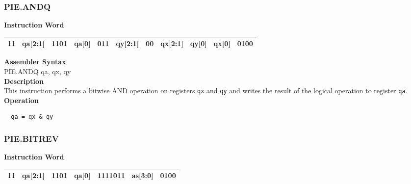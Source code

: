 \subsubsection{PIE.ANDQ}\label{instruction:PIEANDQ}
\setlength\tabcolsep{6pt}
\textbf{Instruction Word} \\
\begin{tabular}{|c|c|c|c|c|c|c|c|c|c|c|}
	\hline
	11 & qa[2:1] & 1101 & qa[0] & 011 & qy[2:1] & 00 & qx[2:1] & qy[0] & qx[0] & 0100 \\
	\hline
\end{tabular}

\textbf{Assembler Syntax} \\
PIE.ANDQ qa, qx, qy \\
\textbf{Description} \\
This instruction performs a bitwise AND operation on registers \lstinline{qx} and \lstinline{qy} and writes the result of the logical operation to register \lstinline{qa}.\\
\textbf{Operation}
\begin{lstlisting}
  qa = qx & qy
\end{lstlisting}

\newpage
\subsubsection{PIE.BITREV}\label{instruction:PIEBITREV}
\setlength\tabcolsep{6pt}
\textbf{Instruction Word} \\
\begin{tabular}{|c|c|c|c|c|c|c|}
	\hline
	11 & qa[2:1] & 1101 & qa[0] & 1111011 & as[3:0] & 0100 \\
	\hline
\end{tabular}

